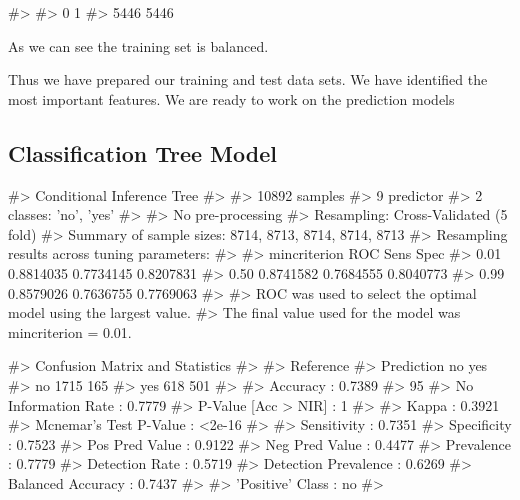 \begin{Schunk}
\begin{Soutput}
#> 
#>    0    1 
#> 5446 5446
\end{Soutput}
\end{Schunk}

As we can see the training set is balanced.

Thus we have prepared our training and test data sets. We have
identified the most important features. We are ready to work on the
prediction models

\hypertarget{classification-tree-model}{%
\subsection{Classification Tree Model}\label{classification-tree-model}}

\begin{Schunk}
\begin{Soutput}
#> Conditional Inference Tree 
#> 
#> 10892 samples
#>     9 predictor
#>     2 classes: 'no', 'yes' 
#> 
#> No pre-processing
#> Resampling: Cross-Validated (5 fold) 
#> Summary of sample sizes: 8714, 8713, 8714, 8714, 8713 
#> Resampling results across tuning parameters:
#> 
#>   mincriterion  ROC        Sens       Spec     
#>   0.01          0.8814035  0.7734145  0.8207831
#>   0.50          0.8741582  0.7684555  0.8040773
#>   0.99          0.8579026  0.7636755  0.7769063
#> 
#> ROC was used to select the optimal model using the largest value.
#> The final value used for the model was mincriterion = 0.01.
\end{Soutput}
\end{Schunk}

\begin{Schunk}
\begin{Soutput}
#> Confusion Matrix and Statistics
#> 
#>           Reference
#> Prediction   no  yes
#>        no  1715  165
#>        yes  618  501
#>                                           
#>                Accuracy : 0.7389          
#>                  95%
#>     No Information Rate : 0.7779          
#>     P-Value [Acc > NIR] : 1               
#>                                           
#>                   Kappa : 0.3921          
#>  Mcnemar's Test P-Value : <2e-16          
#>                                           
#>             Sensitivity : 0.7351          
#>             Specificity : 0.7523          
#>          Pos Pred Value : 0.9122          
#>          Neg Pred Value : 0.4477          
#>              Prevalence : 0.7779          
#>          Detection Rate : 0.5719          
#>    Detection Prevalence : 0.6269          
#>       Balanced Accuracy : 0.7437          
#>                                           
#>        'Positive' Class : no              
#> 
\end{Soutput}
\end{Schunk}

